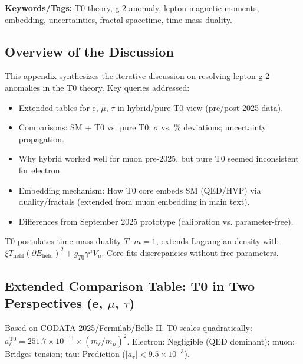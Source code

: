 \documentclass[12pt,a4paper]{article}
\begin{document}
	\textbf{Keywords/Tags:} T0 theory, g-2 anomaly, lepton magnetic moments, embedding, uncertainties, fractal spacetime, time-mass duality.
	
	\subsection{Overview of the Discussion}
	
	This appendix synthesizes the iterative discussion on resolving lepton g-2 anomalies in the T0 theory. Key queries addressed:
	\begin{itemize}
		\item Extended tables for e, $\mu$, $\tau$ in hybrid/pure T0 view (pre/post-2025 data).
		\item Comparisons: SM + T0 vs. pure T0; $\sigma$ vs. \% deviations; uncertainty propagation.
		\item Why hybrid worked well for muon pre-2025, but pure T0 seemed inconsistent for electron.
		\item Embedding mechanism: How T0 core embeds SM (QED/HVP) via duality/fractals (extended from muon embedding in main text).
		\item Differences from September 2025 prototype (calibration vs. parameter-free).
	\end{itemize}
	
	T0 postulates time-mass duality $T \cdot m = 1$, extends Lagrangian density with $\xi T_\text{field} (\partial E_\text{field})^2 + g_{T0} \gamma^\mu V_\mu$. Core fits discrepancies without free parameters.
	
	\subsection{Extended Comparison Table: T0 in Two Perspectives (e, $\mu$, $\tau$)}
	
	Based on CODATA 2025/Fermilab/Belle II. T0 scales quadratically: $a_\ell^\text{T0} = 251.7 \times 10^{-11} \times (m_\ell / m_\mu)^2$. Electron: Negligible (QED dominant); muon: Bridges tension; tau: Prediction ($|a_\tau| < 9.5 \times 10^{-3}$).
	
\end{document}
